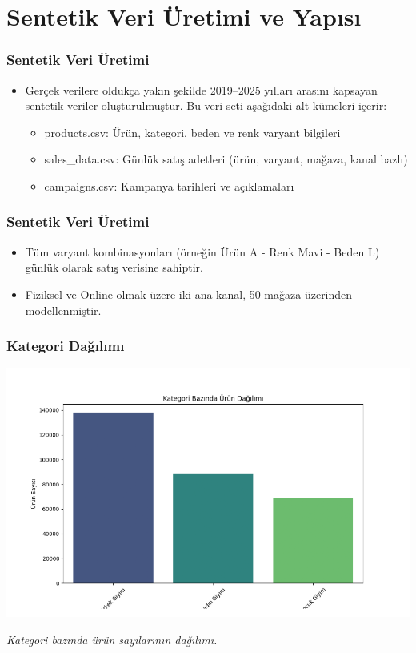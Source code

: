 \documentclass[12pt]{beamer}
\begin{document}

\section{Sentetik Veri Üretimi ve Yapısı}
\begin{frame}
	\frametitle{Sentetik Veri Üretimi}
	\begin{itemize}
		\item Gerçek verilere oldukça yakın şekilde 2019–2025 yılları
		      arasını kapsayan sentetik veriler oluşturulmuştur. Bu veri seti aşağıdaki alt
		      kümeleri içerir:
		      \begin{itemize}
			      \item products.csv: Ürün, kategori, beden ve renk
			            varyant bilgileri
			      \item sales\_data.csv: Günlük satış adetleri (ürün,
			            varyant, mağaza, kanal bazlı)
			      \item campaigns.csv: Kampanya tarihleri ve açıklamaları
		      \end{itemize}

	\end{itemize}
\end{frame}

\begin{frame}
	\frametitle{Sentetik Veri Üretimi}
	\begin{itemize}
		\item Tüm varyant kombinasyonları (örneğin Ürün A - Renk Mavi -
		      Beden L) günlük olarak satış verisine sahiptir.
		\item Fiziksel ve Online olmak üzere iki ana kanal, 50 mağaza
		      üzerinden modellenmiştir.
	\end{itemize}
\end{frame}

\begin{frame}
	\frametitle{Kategori Dağılımı}
	\centering

	\includegraphics[width=0.65\linewidth]{figures/category_distribution.png}

	\vspace{0.5em}
	\small\textit{Kategori bazında ürün sayılarının dağılımı.}
\end{frame}
\end{document}
